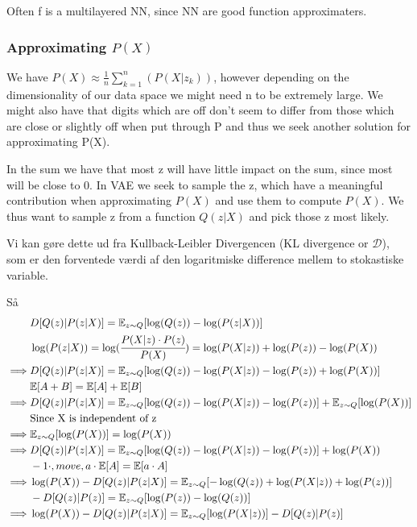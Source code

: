 \documentclass[12pt,a4paper]{report}
\begin{document}
Often f is a multilayered NN, since NN are good function approximaters.
\\ \vspace{0.3cm}

\subsubsection{Approximating \(P(X)\)}

We have \(P(X) \approx \frac{1}{n} \sum_{k=1}^{n} \left(P(X|z_{k})\right)\), however depending on the dimensionality of our data space we might need n to be extremely large.
We might also have that digits which are off don't seem to differ from those which are close or slightly off when put through P and thus we seek another solution for approximating P(X).
\\ \vspace{0.3cm}

In the sum we have that most z will have little impact on the sum, since most will be close to 0.
In VAE we seek to sample the z, which have a meaningful contribution when approximating \(P(X)\) and use them to compute \(P(X)\).
We thus want to sample z from a function \(Q(z|X)\) and pick those z most likely.
\\ \vspace{0.3cm}

Vi kan gøre dette ud fra Kullback-Leibler Divergencen (KL divergence or $\mathcal{D}$), som er den forventede værdi af den logaritmiske difference mellem to stokastiske variable.
\\ \vspace{0.3cm}

Så 
\setcounter{equation}{0}
\begin{align*}
&D[Q(z)| P(z|X)] = \mathbb{E}_{z \sim Q} [\log(Q(z)) - \log(P(z|X))]\\
&\log(P(z|X)) = \log(\cfrac{P(X|z) \cdot P(z)}{P(X)}) = \log(P(X|z)) + \log(P(z)) - \log(P(X))\\
\implies & D[Q(z)| P(z|X)] = \mathbb{E}_{z \sim Q} [\log(Q(z)) - \log(P(X|z)) - \log(P(z)) + \log(P(X))]\\
&\mathbb{E}[A + B] = \mathbb{E}[A] + \mathbb{E}[B]\\
\implies & D[Q(z)| P(z|X)] = \mathbb{E}_{z \sim Q} [\log(Q(z)) - \log(P(X|z)) - \log(P(z)) ] + \mathbb{E}_{z \sim Q}[\log(P(X))]\\
&\text{Since X is independent of z }\\
\implies & \mathbb{E}_{z \sim Q}[\log(P(X))] = \log(P(X))\\
\implies & D[Q(z)| P(z|X)] = \mathbb{E}_{z \sim Q} [\log(Q(z)) - \log(P(X|z)) - \log(P(z)) ] + \log(P(X))\\
& -1 \cdot, move, a \cdot \mathbb{E}[A] = \mathbb{E}[a \cdot A] ~\\
\implies & \log(P(X))- D[Q(z)| P(z|X)] = \mathbb{E}_{z \sim Q} [-\log(Q(z)) + \log(P(X|z)) + \log(P(z)) ] \\
&-D[Q(z)|P(z)] = \mathbb{E}_{z \sim Q}[\log(P(z)) - \log(Q(z))]\\
\implies & \log(P(X))- D[Q(z)| P(z|X)] = \mathbb{E}_{z \sim Q} [\log(P(X|z))] - D[Q(z)|P(z)] \\
\end{align*}
\end{document}
